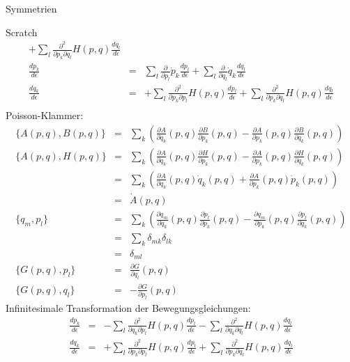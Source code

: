 \documentclass[a4paper,fleqn]{article}
\numberwithin{equation}{section}
\begin{document}
\begin{section}{Symmetrien}
\begin{subsection}{Scratch}
\begin{eqnarray*}
+\sum_l\frac{\partial^2}{\partial p_k\partial q_l}H\left(p,q\right)\frac{dq_l}{d\epsilon}\\
\frac{d\dot{p}_k}{d\epsilon} &=& 
\sum_l\frac{\partial}{\partial p_l}\dot{p}_k\frac{dp_l}{d\epsilon}
+\sum_l\frac{\partial}{\partial q_l}\dot{q}_k\frac{dq_l}{d\epsilon}\\
\frac{d\dot{q}_k}{d\epsilon} &=& 
+\sum_l\frac{\partial^2}{\partial p_k\partial p_l}H\left(p,q\right)\frac{dp_l}{d\epsilon}
+\sum_l\frac{\partial^2}{\partial p_k\partial q_l}H\left(p,q\right)\frac{dq_l}{d\epsilon}\\
\end{eqnarray*}
Poisson-Klammer:
\begin{eqnarray*}
\{A(p,q),B(p,q)\} &=& \sum_k\left(\frac{\partial A}{\partial q_k}(p,q)\frac{\partial B}{\partial p_k}(p,q)
-\frac{\partial A}{\partial p_k}(p,q)\frac{\partial B}{\partial q_k}(p,q)\right)\\
\{A(p,q),H(p,q)\} &=& \sum_k\left(\frac{\partial A}{\partial q_k}(p,q)\frac{\partial H}{\partial p_k}(p,q)
-\frac{\partial A}{\partial p_k}(p,q)\frac{\partial H}{\partial q_k}(p,q)\right)\\
&=& \sum_k\left(\frac{\partial A}{\partial q_k}(p,q)\dot{q}_k(p,q)
+\frac{\partial A}{\partial p_k}(p,q)\dot{p}_k(p,q)\right)\\
&=&\dot{A}(p,q)\\
\{q_m,p_l\} &=& \sum_k\left(\frac{\partial q_m}{\partial q_k}(p,q)\frac{\partial p_l}{\partial p_k}(p,q)
-\frac{\partial q_m}{\partial p_k}(p,q)\frac{\partial p_l}{\partial q_k}(p,q)\right)\\
&=& \sum_k\delta_{mk}\delta_{lk}\\
&=&\delta_{ml}\\
\{G(p,q),p_l\} &=& \frac{\partial G}{\partial q_l}(p,q)\\
\{G(p,q),q_l\} &=& -\frac{\partial G}{\partial p_l}(p,q)
\end{eqnarray*}
Infinitesimale Transformation der Bewegungsgleichungen:
\begin{eqnarray*}
\frac{d\dot{p}_k}{d\epsilon} &=& 
-\sum_l\frac{\partial^2}{\partial q_k\partial p_l}H\left(p,q\right)\frac{dp_l}{d\epsilon}
-\sum_l\frac{\partial^2}{\partial q_k\partial q_l}H\left(p,q\right)\frac{dq_l}{d\epsilon}\\
\frac{d\dot{q}_k}{d\epsilon} &=& 
+\sum_l\frac{\partial^2}{\partial p_k\partial p_l}H\left(p,q\right)\frac{dp_l}{d\epsilon}
+\sum_l\frac{\partial^2}{\partial p_k\partial q_l}H\left(p,q\right)\frac{dq_l}{d\epsilon}
\end{eqnarray*}

\end{subsection}
\end{section}
\end{document}
